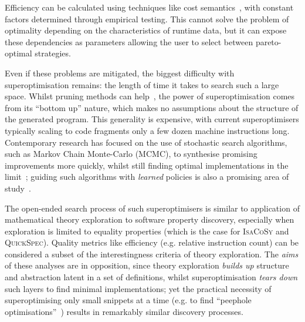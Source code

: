 Efficiency can be calculated using techniques like cost
semantics~\cite{danner2015denotational}, with constant factors determined
through empirical testing. This cannot solve the problem of optimality depending
on the characteristics of runtime data, but it can expose these dependencies as
parameters allowing the user to select between pareto-optimal strategies.

Even if these problems are mitigated, the biggest difficulty with
superoptimisation remains: the length of time it takes to search such a
large space. Whilst pruning methods can help~\cite{phothilimthana2016scaling},
the power of superoptimisation comes from its ``bottom up'' nature, which makes
no assumptions about the structure of the generated program. This generality is
expensive, with current superoptimisers typically scaling to code fragments only
a few dozen machine instructions long. Contemporary research has focused on the
use of stochastic search algorithms, such as Markov Chain Monte-Carlo (MCMC), to
synthesise promising improvements more quickly, whilst still finding optimal
implementations in the limit~\cite{schkufza2013stochastic}; guiding such
algorithms with \emph{learned} policies is also a promising area of
study~\cite{mudigonda2017learning}.

The open-ended search process of such superoptimisers is similar to application
of mathematical theory exploration to software property discovery, especially
when exploration is limited to equality properties (which is the case for
\textsc{IsaCoSy} and \textsc{QuickSpec}). Quality metrics like efficiency (e.g.
relative instruction count) can be considered a subset of the interestingness
criteria of theory exploration. The \emph{aims} of these analyses are in
opposition, since theory exploration \emph{builds up} structure and abstraction
latent in a set of definitions, whilst superoptimisation \emph{tears down} such
layers to find minimal implementations; yet the practical necessity of
superoptimising only small snippets at a time (e.g. to find ``peephole
optimisations''~\cite{Bansal.Aiken:2006}) results in remarkably similar
discovery processes.

